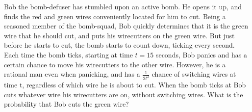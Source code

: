 Bob the bomb-defuser has stumbled upon an active bomb. He opens it up, and finds the red and green wires conveniently located for him to cut. Being a seasoned member of the bomb-squad, Bob
quickly determines that it is the green wire that he should cut, and puts his wirecutters on the green wire. But just before he starts to cut, the bomb starts to count down, ticking every second. Each time the bomb ticks, starting at time $t=15$ seconds, Bob panics and has a certain chance to move his wirecutters to the other wire. However, he is a rational man even when panicking, and has a $\frac{1}{2t^2}$ chance of switching wires at time t, regardless of which wire he is about to cut. When the bomb ticks at  Bob cuts whatever wire his wirecutters are on, without switching wires.
What is the probability that Bob cuts the green wire?